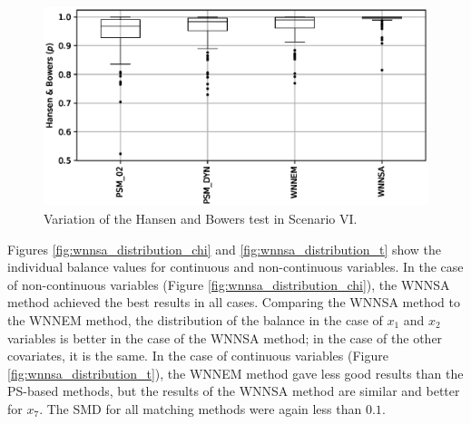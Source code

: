 		\begin{figure}[h]
			\centering
			\captionsetup{justification=centering}
			\includegraphics[width=\textwidth]{assets/figures/control_group_selection/wnnsa/scenVI/hbp.eps}
			\caption{Variation of the Hansen and Bowers test in Scenario VI. %
			}
			\label{fig:wnnsa_scen_VI_hbp}    
		\end{figure}
										
		Figures \ref{fig:wnnsa_distribution_chi} and \ref{fig:wnnsa_distribution_t} show the individual balance values for continuous and non-continuous variables. In the case of non-continuous variables (Figure \ref{fig:wnnsa_distribution_chi}), the WNNSA method achieved the best results in all cases. Comparing the WNNSA method to the WNNEM method, the distribution of the balance in the case of $x_1$ and $x_2$ variables is better in the case of the WNNSA method; in the case of the other covariates, it is the same. In the case of continuous variables (Figure \ref{fig:wnnsa_distribution_t}), the WNNEM method gave less good results than the PS-based methods, but the results of the WNNSA method are similar and better for $x_7$. The SMD for all matching methods were again less than $0.1$.
										
